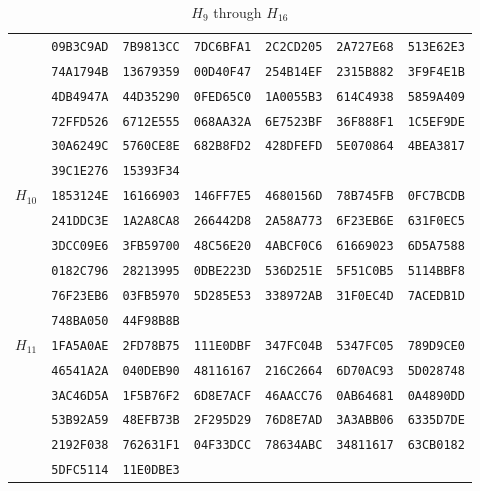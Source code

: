 \begin{table}\centering\caption{$H_{9}$ through $H_{16}$}
\begin{tabular}{@{}ccccccc@{}}\toprule\label{table:H32_2}
\multirow{6}{*}{$H_{9}$}
 & \texttt{09B3C9AD} & \texttt{7B9813CC} & \texttt{7DC6BFA1} & \texttt{2C2CD205} & \texttt{2A727E68} & \texttt{513E62E3}\\
 & \texttt{74A1794B} & \texttt{13679359} & \texttt{00D40F47} & \texttt{254B14EF} & \texttt{2315B882} & \texttt{3F9F4E1B}\\
 & \texttt{4DB4947A} & \texttt{44D35290} & \texttt{0FED65C0} & \texttt{1A0055B3} & \texttt{614C4938} & \texttt{5859A409}\\
 & \texttt{72FFD526} & \texttt{6712E555} & \texttt{068AA32A} & \texttt{6E7523BF} & \texttt{36F888F1} & \texttt{1C5EF9DE}\\
 & \texttt{30A6249C} & \texttt{5760CE8E} & \texttt{682B8FD2} & \texttt{428DFEFD} & \texttt{5E070864} & \texttt{4BEA3817}\\
 & \texttt{39C1E276} & \texttt{15393F34}\\

\midrule
\multirow{6}{*}{$H_{10}$}
 & \texttt{1853124E} & \texttt{16166903} & \texttt{146FF7E5} & \texttt{4680156D} & \texttt{78B745FB} & \texttt{0FC7BCDB}\\
 & \texttt{241DDC3E} & \texttt{1A2A8CA8} & \texttt{266442D8} & \texttt{2A58A773} & \texttt{6F23EB6E} & \texttt{631F0EC5}\\
 & \texttt{3DCC09E6} & \texttt{3FB59700} & \texttt{48C56E20} & \texttt{4ABCF0C6} & \texttt{61669023} & \texttt{6D5A7588}\\
 & \texttt{0182C796} & \texttt{28213995} & \texttt{0DBE223D} & \texttt{536D251E} & \texttt{5F51C0B5} & \texttt{5114BBF8}\\
 & \texttt{76F23EB6} & \texttt{03FB5970} & \texttt{5D285E53} & \texttt{338972AB} & \texttt{31F0EC4D} & \texttt{7ACEDB1D}\\
 & \texttt{748BA050} & \texttt{44F98B8B}\\

\midrule
\multirow{6}{*}{$H_{11}$}
 & \texttt{1FA5A0AE} & \texttt{2FD78B75} & \texttt{111E0DBF} & \texttt{347FC04B} & \texttt{5347FC05} & \texttt{789D9CE0}\\
 & \texttt{46541A2A} & \texttt{040DEB90} & \texttt{48116167} & \texttt{216C2664} & \texttt{6D70AC93} & \texttt{5D028748}\\
 & \texttt{3AC46D5A} & \texttt{1F5B76F2} & \texttt{6D8E7ACF} & \texttt{46AACC76} & \texttt{0AB64681} & \texttt{0A4890DD}\\
 & \texttt{53B92A59} & \texttt{48EFB73B} & \texttt{2F295D29} & \texttt{76D8E7AD} & \texttt{3A3ABB06} & \texttt{6335D7DE}\\
 & \texttt{2192F038} & \texttt{762631F1} & \texttt{04F33DCC} & \texttt{78634ABC} & \texttt{34811617} & \texttt{63CB0182}\\
 & \texttt{5DFC5114} & \texttt{11E0DBE3}\\


\end{tabular}
\end{table}
